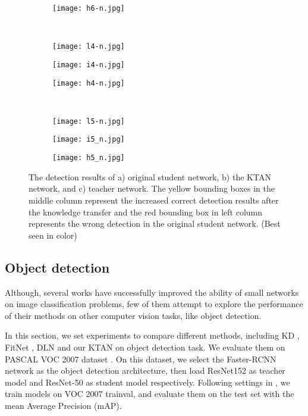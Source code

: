 \documentclass[letterpaper]{article} %
\begin{document}
\begin{figure}[t!]
\begin{subfigure}[b]{.33\linewidth}
		\texttt{[image: h6-n.jpg]}
	\end{subfigure}%
	\vspace{3pt}\\
	\begin{subfigure}[b]{.33\linewidth}
		\centering
		\texttt{[image: l4-n.jpg]}
	\end{subfigure}%
	\begin{subfigure}[b]{.33\linewidth}
		\centering
		\texttt{[image: i4-n.jpg]}
	\end{subfigure}%
	\begin{subfigure}[b]{.33\linewidth}
		\centering
		\texttt{[image: h4-n.jpg]}
	\end{subfigure}%
	\vspace{3pt}\\
	\begin{subfigure}[b]{.33\linewidth}
		\centering
		\texttt{[image: l5-n.jpg]}
		\caption{ }
	\end{subfigure}%
	\begin{subfigure}[b]{.33\linewidth}
		\centering
		\texttt{[image: i5\_n.jpg]}
		\caption{ }
	\end{subfigure}%
	\begin{subfigure}[b]{.33\linewidth}
		\centering
		\texttt{[image: h5\_n.jpg]}
		\caption{ }
	\end{subfigure}%
	\caption{The detection results of a) original student network, b) the KTAN network, and c) teacher network. The yellow bounding boxes in the middle column represent the increased correct detection results after the knowledge transfer and the red bounding box in left column represents the wrong detection in the original student network. (Best seen in color)}
\end{figure}

\subsection{Object detection}

Although, several works have successfully improved the ability of small networks on image classification problems, few of them attempt to explore the performance of their methods on other computer vision tasks, like object detection.

In this section, we set experiments to compare different methods, including KD \cite{hinton2015distilling}, FitNet \cite{romero2014fitnets}, DLN and our KTAN on object detection task. We evaluate them on PASCAL VOC 2007 dataset \cite{Everingham10}. On this dataset, we select the Faster-RCNN network as the object detection architecture, then load ResNet152 \cite{he2016deep} as teacher model and ResNet-50 \cite{he2016deep} as student model respectively. Following settings in \cite{girshick2015fast}, we train models on VOC 2007 trainval, and evaluate them on the test set with the mean Average Precision (mAP).
\end{document}
